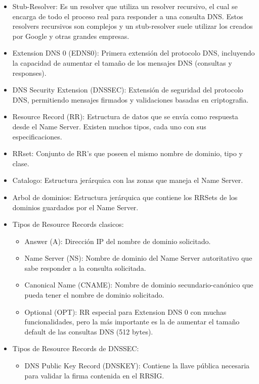 \begin{itemize}
    \item Stub-Resolver: Es un resolver que utiliza un resolver recursivo, el cual se encarga de todo el proceso real para responder a una 
    consulta DNS. Estos resolvers recursivos son complejos y un stub-resolver suele utilizar los creados por Google y otras grandes empresas.
    \item Extension DNS 0 (EDNS0): Primera extensión del protocolo DNS, incluyendo la capacidad de aumentar el tamaño de los mensajes DNS 
    (consultas y responses).
    \item DNS Security Extension (DNSSEC): Extensión de seguridad del protocolo DNS, permitiendo mensajes firmados y validaciones basadas 
    en criptografia.
    \item Resource Record (RR): Estructura de datos que se envía como respuesta desde el Name Server. Existen muchos tipos, cada uno con 
    sus especificaciones.
    \item RRset: Conjunto de RR's que poseen el mismo nombre de dominio, tipo y clase.
    \item Catalogo: Estructura jerárquica con las zonas que maneja el Name Server.
    \item Arbol de dominios: Estructura jerárquica que contiene los RRSets de los dominios guardados por el Name Server.
    \item Tipos de Resource Records clasicos:
        \begin{itemize}
            \item Answer (A): Dirección IP del nombre de dominio solicitado.
            \item Name Server (NS): Nombre de dominio del Name Server autoritativo que sabe responder a la consulta solicitada. 
            \item Canonical Name (CNAME): Nombre de dominio secundario-canónico que pueda tener el nombre de dominio solicitado.
            \item Optional (OPT): RR especial para Extension DNS 0 con muchas funcionalidades, pero la más importante es la de aumentar el 
            tamaño default de las consultas DNS (512 bytes).
        \end{itemize}
    \item Tipos de Resource Records de DNSSEC:
            \begin{itemize}
            \item DNS Public Key Record (DNSKEY): Contiene la llave pública necesaria para validar la firma contenida en el RRSIG.

\end{itemize}
\end{itemize}
